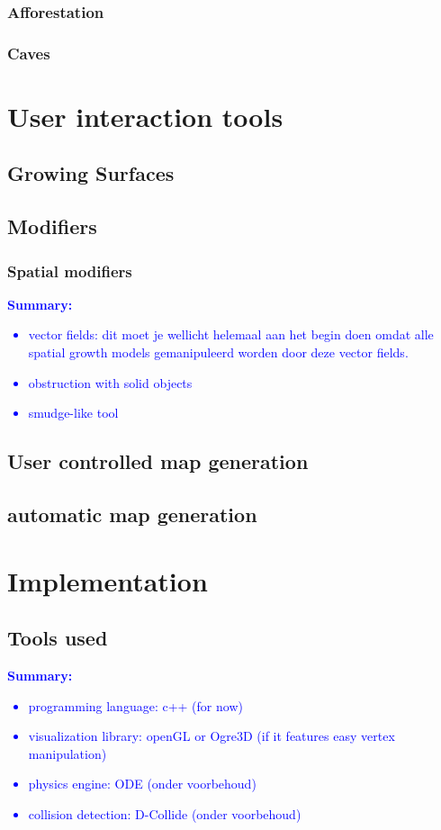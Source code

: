 \documentclass{article}
\newcommand{\inhoud}[1]{\textcolor{blue}{\textbf{\newline Summary: }\it{#1}}}
\begin{document}
\subsubsection{Afforestation} 

\subsubsection{Caves}

\section{User interaction tools}

\subsection{Growing Surfaces}

\subsection{Modifiers}

\subsubsection{Spatial modifiers}

\inhoud{
\begin{itemize}
\item vector fields: dit moet je wellicht helemaal aan het begin doen omdat alle spatial growth models
gemanipuleerd worden door deze vector fields.
\item obstruction with solid objects
\item smudge-like tool
\end{itemize}
}

\subsection{User controlled map generation}

\subsection{automatic map generation} 


\section{Implementation}
\subsection{Tools used}
\inhoud{ 
\begin{itemize}
\item programming language: c++ (for now)
\item visualization library: openGL or Ogre3D (if it features easy vertex manipulation) 
\item physics engine: ODE (onder voorbehoud)  
\item collision detection: D-Collide (onder voorbehoud)
\end{itemize}
}
\end{document}
